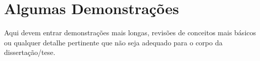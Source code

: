 \chapter{Algumas Demonstrações}

Aqui devem entrar demonstrações mais longas, revisões de conceitos mais básicos
ou qualquer detalhe pertinente que não seja adequado para o corpo da
dissertação/tese.
